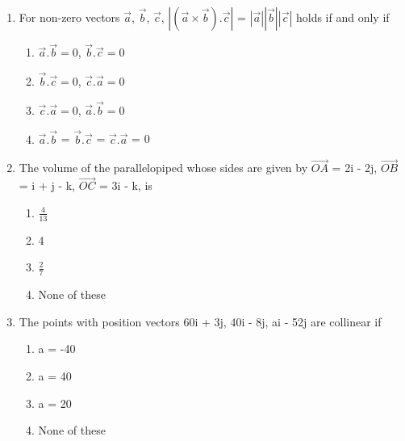 \begin{enumerate}[label=\arabic*.,ref=\thesubsection.\theenumi]
\item For non-zero vectors $\overrightarrow{a}$, $\overrightarrow{b}$, $\overrightarrow{c}$, $| (\overrightarrow{a} \times \overrightarrow{b}) .  \overrightarrow{c} |$ = $|\overrightarrow{a}||\overrightarrow{b}||\overrightarrow{c}|$ holds if and only if 
\begin{enumerate}
\item $\overrightarrow{a}.\overrightarrow{b} = 0$, $\overrightarrow{b}.\overrightarrow{c} = 0$
\item $\overrightarrow{b}.\overrightarrow{c} = 0$, $\overrightarrow{c}.\overrightarrow{a} = 0$
\item $\overrightarrow{c}.\overrightarrow{a} = 0$, $\overrightarrow{a}.\overrightarrow{b} = 0$
\item $\overrightarrow{a}.\overrightarrow{b}$ = $\overrightarrow{b}.\overrightarrow{c}$  = $\overrightarrow{c}.\overrightarrow{a}$ = 0
\end{enumerate}

\item The volume of the parallelopiped whose sides are given by $\overrightarrow{OA}$ = 2i - 2j, $\overrightarrow{OB}$ = i + j - k, $\overrightarrow{OC}$ = 3i - k, is
\begin{enumerate}
\item $\frac{4}{13}$
\item 4
\item $\frac{2}{7}$
\item None of these
\end{enumerate}

\item The points with position vectors 60i + 3j, 40i - 8j, ai - 52j are collinear if
\begin{enumerate}
\item a = -40
\item a = 40
\item a = 20
\item None of these
\end{enumerate}


\end{enumerate}
